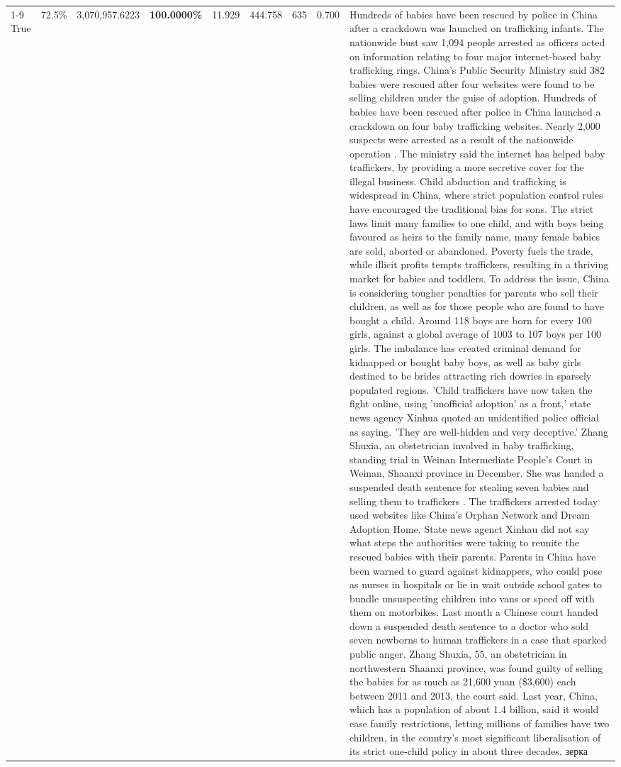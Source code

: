 \begin{table}[H]
\begin{tabular}{lllrlllll}
\cline{1-9}
True & 72.5\% & 3,070,957.6223 & \bfseries \color{red} 100.0000\% & 11.929 & 444.758 & 635 & 0.700 & Hundreds of babies have been rescued by police in China after a crackdown was launched on trafficking infants. The nationwide bust saw 1,094 people arrested as officers acted on information relating to four major internet-based baby trafficking rings. China's Public Security Ministry said 382 babies were rescued after four websites were found to be selling children under the guise of adoption. Hundreds of babies have been rescued after police in China launched a crackdown on four baby trafficking websites. Nearly 2,000 suspects were arrested as a result of the nationwide operation . The ministry said the internet has helped baby traffickers, by providing a more secretive cover for the illegal business. Child abduction and trafficking is widespread in China, where strict population control rules have encouraged the traditional bias for sons. The strict laws limit many families to one child, and with boys being favoured as heirs to the family name, many female babies are sold, aborted or abandoned. Poverty fuels the trade, while illicit profits tempts traffickers, resulting in a thriving market for babies and toddlers. To address the issue, China is considering tougher penalties for parents who sell their children, as well as for those people who are found to have bought a child. Around 118 boys are born for every 100 girls, against a global average of 1003 to 107 boys per 100 girls. The imbalance has created criminal demand for kidnapped or bought baby boys, as well as baby girls destined to be brides attracting rich dowries in sparsely populated regions. 'Child traffickers have now taken the fight online, using 'unofficial adoption' as a front,' state news agency Xinhua quoted an unidentified police official as saying. 'They are well-hidden and very deceptive.' Zhang Shuxia, an obstetrician involved in baby trafficking, standing trial in Weinan Intermediate People's Court in Weinan, Shaanxi province in December. She was handed a suspended death sentence for stealing seven babies and selling them to traffickers . The traffickers arrested today used websites like China's Orphan Network and Dream Adoption Home. State news agenct Xinhau did not say what steps the authorities were taking to reunite the rescued babies with their parents. Parents in China have been warned to guard against kidnappers, who could pose as nurses in hospitals or lie in wait outside school gates to bundle unsuspecting children into vans or speed off with them on motorbikes. Last month a Chinese court handed down a suspended death sentence to a doctor who sold seven newborns to human traffickers in a case that sparked public anger. Zhang Shuxia, 55, an obstetrician in northwestern Shaanxi province, was found guilty of selling the babies for as much as 21,600 yuan (\$3,600) each between 2011 and 2013, the court said. Last year, China, which has a population of about 1.4 billion, said it would ease family restrictions, letting millions of families have two children, in the country's most significant liberalisation of its strict one-child policy in about three decades. зерка \\

\end{tabular}
\end{table}
